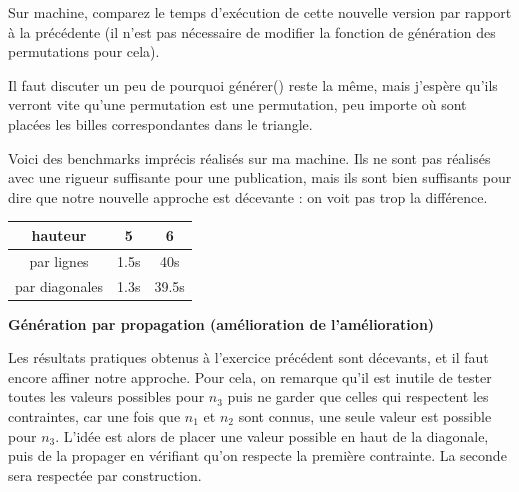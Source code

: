 \documentclass[10pt]{article}\usepackage[nu]{esial}
\begin{document}
\begin{Question}
  Sur machine, comparez le temps d'exécution de cette nouvelle version par
  rapport à la précédente (il n'est pas nécessaire de modifier la fonction de
  génération des permutations pour cela).
\end{Question}

\begin{Reponse}
  Il faut discuter un peu de pourquoi générer() reste la même, mais j'espère
  qu'ils verront vite qu'une permutation est une permutation, peu importe où
  sont placées les billes correspondantes dans le triangle.
  
  Voici des benchmarks imprécis réalisés sur ma machine. Ils ne sont pas
  réalisés avec une rigueur suffisante pour une publication, mais ils sont bien
  suffisants pour dire que notre nouvelle approche est décevante : on voit pas
  trop la différence.

  \begin{tabular}{|c|c|c|}\hline
    hauteur       &5&6\\\hline
    par lignes    &1.5s&40s\\\hline
    par diagonales&1.3s&39.5s\\\hline
  \end{tabular}
\end{Reponse}

\begin{Exercice}\textbf{Génération par propagation (amélioration de l'amélioration)}
\end{Exercice}

\noindent Les résultats pratiques obtenus à l'exercice précédent sont décevants,
et il faut encore affiner notre approche. Pour cela, on remarque qu'il est
inutile de tester toutes les valeurs possibles pour $n_3$ puis ne garder que
celles qui respectent les contraintes, car une fois que $n_1$ et $n_2$ sont
connus, une seule valeur est possible pour $n_3$. L'idée est alors de placer
une valeur possible en haut de la diagonale, puis de la propager en vérifiant
qu'on respecte la première contrainte. La seconde sera respectée par construction.
\end{document}

